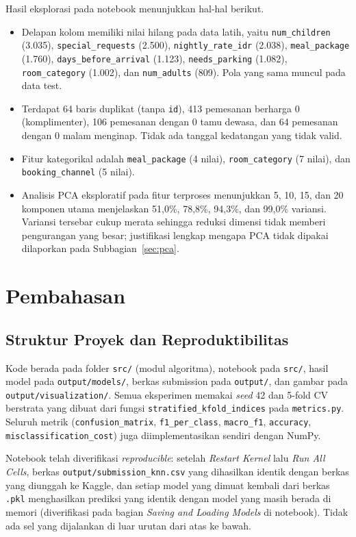 \documentclass[12pt,a4paper]{article}
\begin{document}
Hasil eksplorasi pada notebook menunjukkan hal-hal berikut.
\begin{itemize}
\item Delapan kolom memiliki nilai hilang pada data latih, yaitu \texttt{num\_children} (3.035), \texttt{special\_requests} (2.500), \texttt{nightly\_rate\_idr} (2.038), \texttt{meal\_package} (1.760), \texttt{days\_before\_arrival} (1.123), \texttt{needs\_parking} (1.082), \texttt{room\_category} (1.002), dan \texttt{num\_adults} (809). Pola yang sama muncul pada data test.
\item Terdapat 64 baris duplikat (tanpa \texttt{id}), 413 pemesanan berharga 0 (komplimenter), 106 pemesanan dengan 0 tamu dewasa, dan 64 pemesanan dengan 0 malam menginap. Tidak ada tanggal kedatangan yang tidak valid.
\item Fitur kategorikal adalah \texttt{meal\_package} (4 nilai), \texttt{room\_category} (7 nilai), dan \texttt{booking\_channel} (5 nilai).
\item Analisis PCA eksploratif pada fitur terproses menunjukkan 5, 10, 15, dan 20 komponen utama menjelaskan 51,0\%, 78,8\%, 94,3\%, dan 99,0\% variansi. Variansi tersebar cukup merata sehingga reduksi dimensi tidak memberi pengurangan yang besar; justifikasi lengkap mengapa PCA tidak dipakai dilaporkan pada Subbagian~\ref{sec:pca}.
\end{itemize}

\section{Pembahasan}
\subsection{Struktur Proyek dan Reproduktibilitas}
Kode berada pada folder \texttt{src/} (modul algoritma), notebook pada \texttt{src/}, hasil model pada \texttt{output/models/}, berkas submission pada \texttt{output/}, dan gambar pada \texttt{output/visualization/}. Semua eksperimen memakai \textit{seed} 42 dan 5-fold CV berstrata yang dibuat dari fungsi \texttt{stratified\_kfold\_indices} pada \texttt{metrics.py}. Seluruh metrik (\texttt{confusion\_matrix}, \texttt{f1\_per\_class}, \texttt{macro\_f1}, \texttt{accuracy}, \texttt{misclassification\_cost}) juga diimplementasikan sendiri dengan NumPy.

Notebook telah diverifikasi \textit{reproducible}: setelah \textit{Restart Kernel} lalu \textit{Run All Cells}, berkas \texttt{output/submission\_knn.csv} yang dihasilkan identik dengan berkas yang diunggah ke Kaggle, dan setiap model yang dimuat kembali dari berkas \texttt{.pkl} menghasilkan prediksi yang identik dengan model yang masih berada di memori (diverifikasi pada bagian \textit{Saving and Loading Models} di notebook). Tidak ada sel yang dijalankan di luar urutan dari atas ke bawah.
\end{document}
